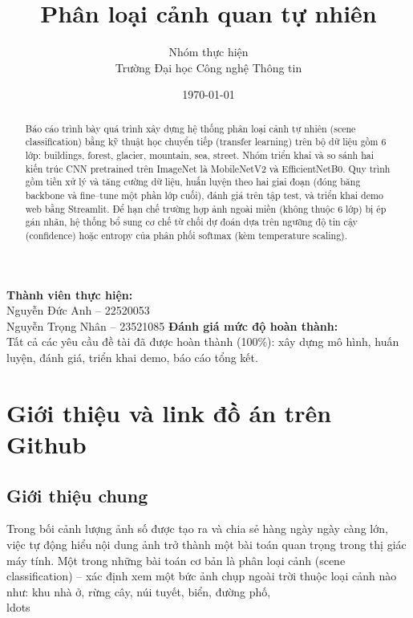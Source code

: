\documentclass[12pt,a4paper]{article}
\title{Phân loại cảnh quan tự nhiên}
\author{Nhóm thực hiện\\Trường Đại học Công nghệ Thông tin}
\date{\today}
\begin{document}

\maketitle

\begin{center}
    \textbf{Thành viên thực hiện:}\\[4pt]
    Nguyễn Đức Anh -- 22520053\\
    Nguyễn Trọng Nhân -- 23521085    
    \vspace{0.5cm}
    \textbf{Đánh giá mức độ hoàn thành:}\\
    Tất cả các yêu cầu đề tài đã được hoàn thành (100\%): xây dựng mô hình, huấn luyện, đánh giá, triển khai demo, báo cáo tổng kết.\end{center}

\begin{abstract}
Báo cáo trình bày quá trình xây dựng hệ thống phân loại cảnh tự nhiên (scene classification) bằng kỹ thuật học chuyển tiếp (transfer learning) trên bộ dữ liệu gồm 6 lớp: buildings, forest, glacier, mountain, sea, street. Nhóm triển khai và so sánh hai kiến trúc CNN pretrained trên ImageNet là MobileNetV2 và EfficientNetB0. Quy trình gồm tiền xử lý và tăng cường dữ liệu, huấn luyện theo hai giai đoạn (đóng băng backbone và fine--tune một phần lớp cuối), đánh giá trên tập test, và triển khai demo web bằng Streamlit. Để hạn chế trường hợp ảnh ngoài miền (không thuộc 6 lớp) bị ép gán nhãn, hệ thống bổ sung cơ chế từ chối dự đoán dựa trên ngưỡng độ tin cậy (confidence) hoặc entropy của phân phối softmax (kèm temperature scaling).
\end{abstract}

\tableofcontents
\newpage

\section{Giới thiệu và link đồ án trên Github}

\subsection{Giới thiệu chung}
Trong bối cảnh lượng ảnh số được tạo ra và chia sẻ hàng ngày ngày càng lớn, việc tự động hiểu nội dung ảnh trở thành một bài toán quan trọng trong thị giác máy tính. Một trong những bài toán cơ bản là phân loại cảnh (scene classification) -- xác định xem một bức ảnh chụp ngoài trời thuộc loại cảnh nào như: khu nhà ở, rừng cây, núi tuyết, biển, đường phố, \\ldots
\end{document}
